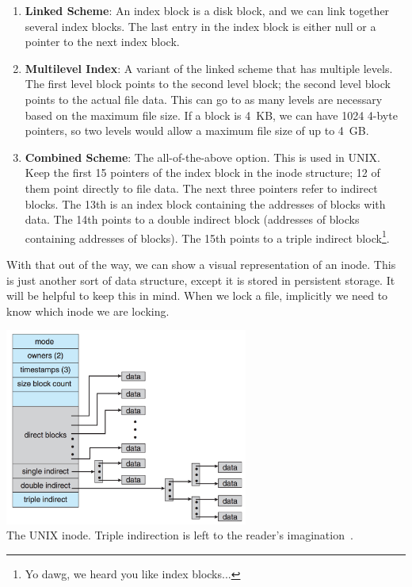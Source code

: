 \begin{enumerate}
	\item \textbf{Linked Scheme}: An index block is a disk block, and we can link together several index blocks. The last entry in the index block is either null or a pointer to the next index block.
	\item \textbf{Multilevel Index}: A variant of the linked scheme that has multiple levels. The first level block points to the second level block; the second level block points to the actual file data. This can go to as many levels are necessary based on the maximum file size. If a block is 4~KB, we can have 1024 4-byte pointers, so two levels would allow a maximum file size of up to 4~GB.
	\item \textbf{Combined Scheme}: The all-of-the-above option. This is used in UNIX. Keep the first 15 pointers of the index block in the inode structure; 12 of them point directly to file data. The next three pointers refer to indirect blocks. The 13th is an index block containing the addresses of blocks with data. The 14th points to a double indirect block (addresses of blocks containing addresses of blocks). The 15th points to a triple indirect block\footnote{Yo dawg, we heard you like index blocks...}.
\end{enumerate}

With that out of the way, we can show a visual representation of an inode. This is just another sort of data structure, except it is stored in persistent storage. It will be helpful to keep this in mind. When we lock a file, implicitly we need to know which inode we are locking.

\begin{center}
	\includegraphics[width=0.6\textwidth]{images/unix-inode.png}\\
	The UNIX inode. Triple indirection is left to the reader's imagination~\cite{osc}.
\end{center}

